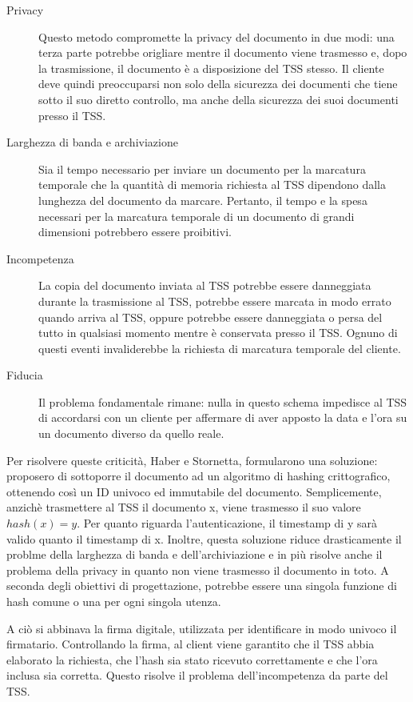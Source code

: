 \begin{description}
  \item[Privacy] Questo metodo compromette la privacy del documento in due modi: una terza parte potrebbe origliare mentre il documento viene trasmesso e, dopo la trasmissione, il documento è a disposizione del TSS stesso. Il cliente deve quindi preoccuparsi non solo della sicurezza dei documenti che tiene sotto il suo diretto controllo, ma anche della sicurezza dei suoi documenti presso il TSS.
  \item[Larghezza di banda e archiviazione] Sia il tempo necessario per inviare un documento per la marcatura temporale che la quantità di memoria richiesta al TSS dipendono dalla lunghezza del documento da marcare. Pertanto, il tempo e la spesa necessari per la marcatura temporale di un documento di grandi dimensioni potrebbero essere proibitivi. 
  \item[Incompetenza] La copia del documento inviata al TSS potrebbe essere danneggiata durante la trasmissione al TSS, potrebbe essere marcata in modo errato quando arriva al TSS, oppure potrebbe essere danneggiata o persa del tutto in qualsiasi momento mentre è conservata presso il TSS. Ognuno di questi eventi invaliderebbe la richiesta di marcatura temporale del cliente.
  \item[Fiducia] Il problema fondamentale rimane: nulla in questo schema impedisce al TSS di accordarsi con un cliente per affermare di aver apposto la data e l'ora su un documento diverso da quello reale.
\end{description}

Per risolvere queste criticità, Haber e Stornetta, formularono una soluzione: proposero di sottoporre il documento ad un algoritmo di hashing crittografico, ottenendo così un ID univoco ed immutabile del documento.
Semplicemente, anzichè trasmettere al TSS il documento x, viene trasmesso il suo valore \(hash(x) = y\). Per quanto riguarda l'autenticazione, il timestamp di y sarà valido quanto il timestamp di x. Inoltre, questa soluzione riduce drasticamente il problme della larghezza di banda e dell'archiviazione e in più risolve anche il problema della privacy in quanto non viene trasmesso il documento in toto. A seconda degli obiettivi di progettazione, potrebbe essere una singola funzione di hash comune o una per ogni singola utenza.

A ciò si abbinava la firma digitale, utilizzata per identificare in modo univoco il firmatario. Controllando la firma, al client viene garantito che il TSS abbia elaborato la richiesta, che l'hash sia stato ricevuto correttamente e che l'ora inclusa sia corretta. Questo risolve il problema dell'incompetenza da parte del TSS.

